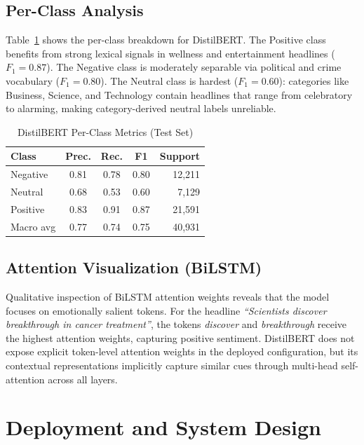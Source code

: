 \documentclass[conference]{IEEEtran}
\begin{document}
\subsection{Per-Class Analysis}
Table~\ref{tab:perclass} shows the per-class breakdown for DistilBERT.
The Positive class benefits from strong lexical signals in wellness and
entertainment headlines ($F_1 = 0.87$). The Negative class is
moderately separable via political and crime vocabulary ($F_1 = 0.80$).
The Neutral class is hardest ($F_1 = 0.60$): categories like Business,
Science, and Technology contain headlines that range from celebratory
to alarming, making category-derived neutral labels unreliable.

\begin{table}[h]
\caption{DistilBERT Per-Class Metrics (Test Set)}
\label{tab:perclass}
\centering
\begin{tabular}{lcccr}
\toprule
\textbf{Class} & \textbf{Prec.} & \textbf{Rec.} & \textbf{F1} & \textbf{Support} \\
\midrule
Negative & 0.81 & 0.78 & 0.80 & 12,211 \\
Neutral  & 0.68 & 0.53 & 0.60 &  7,129 \\
Positive & 0.83 & 0.91 & 0.87 & 21,591 \\
\midrule
Macro avg & 0.77 & 0.74 & 0.75 & 40,931 \\
\bottomrule
\end{tabular}
\end{table}

\subsection{Attention Visualization (BiLSTM)}
Qualitative inspection of BiLSTM attention weights reveals that the
model focuses on emotionally salient tokens. For the headline
\textit{``Scientists discover breakthrough in cancer treatment''}, the
tokens \textit{discover} and \textit{breakthrough} receive the highest
attention weights, capturing positive sentiment. DistilBERT does not
expose explicit token-level attention weights in the deployed
configuration, but its contextual representations implicitly capture
similar cues through multi-head self-attention across all layers.

\section{Deployment and System Design}
\label{sec:deployment}
\end{document}
